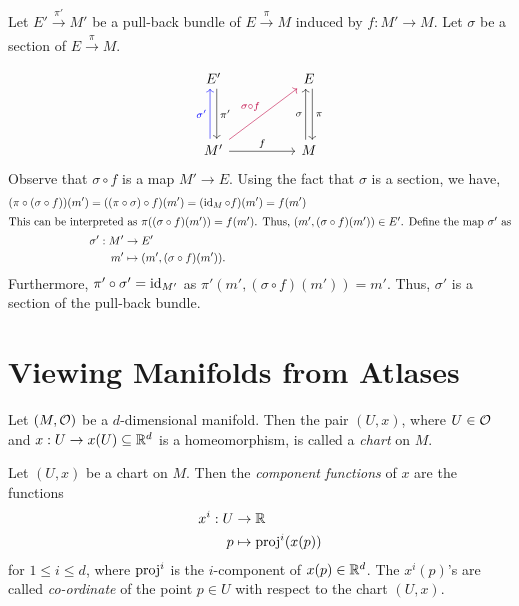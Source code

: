 \begin{remark}
	Let \(E' \xrightarrow[]{\ \pi'\ } M'\) be a pull-back bundle of \(E \xrightarrow[]{\ \pi\ } M\) induced by \(f: M' \to M\). Let \(\sigma\) be a section of \(E \xrightarrow[]{\ \pi\ } M\).
	\begin{equation*}
		\begin{tikzcd}
			E' \arrow[dd, shift left, "\pi'"] & & E \arrow[dd, shift left, "\pi"] \\
			& & \\
			M' \arrow[uu, blue, shift left, "\sigma'"] \arrow[rr, "f"] \arrow[rruu, purple, "\sigma \circ f"] & & M \arrow[uu, shift left, "\sigma"]
		\end{tikzcd}
	\end{equation*}
	Observe that \(\sigma \circ f\) is a map \(M' \to E\). Using the fact that \(\sigma\) is a section, we have,
	\begin{gather}
		(\pi \circ (\sigma \circ f))(m') = ((\pi \circ \sigma) \circ f)(m') = (\operatorname{id}_{M} \circ f)(m') = f(m') \nonumber \\
		\intertext{This can be interpreted as \(\pi((\sigma \circ f)(m')) = f(m')\). Thus, \((m', (\sigma \circ f)(m')) \in E'\). Define the map \(\sigma'\) as}
		\begin{aligned}
			\sigma': M' & \to E'                              \\
			m'          & \mapsto (m', (\sigma \circ f)(m')).
		\end{aligned}
	\end{gather}
	Furthermore, \(\pi' \circ \sigma' = \operatorname{id}_{M'}\) as \(\pi'(m', (\sigma \circ f)(m')) = m'\). Thus, \(\sigma'\) is a section of the pull-back bundle.
\end{remark}

\section{Viewing Manifolds from Atlases}

\begin{definition}[Chart]\label{def:chart}
	Let \((M, \mathcal{O})\) be a \(d\)-dimensional manifold. Then the pair \((U, x)\), where \(U \in \mathcal{O}\) and \(x: U \to x(U) \subseteq \mathbb R^d\) is a homeomorphism, is called a \emph{chart} on \(M\).
\end{definition}

\begin{remark}\label{rem:component-functions}
	Let \((U, x)\) be a chart on \(M\). Then the \emph{component functions} of \(x\) are the functions
	\begin{equation}
		\begin{aligned}
			x^i: U & \to \mathbb R                \\
			p      & \mapsto \operatorname{proj}^i(x(p))
		\end{aligned}
	\end{equation}
	for \(1 \le i \le d\), where \(\operatorname{proj}^i\) is the \(i\)-component of \(x(p) \in \mathbb R^d\). The \(x^i(p)\)'s are called \emph{co-ordinate} of the point \(p \in U\) with respect to the chart \((U, x)\).
\end{remark}

